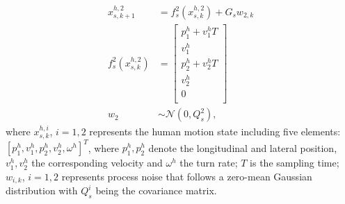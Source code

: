 \documentclass[journal]{IEEEtran}
\begin{document}
    \begin{subequations} \label{eqn:uniform_model}
		\begin{align}
			x_{s,k+1}^{h,2}&= f_s^2(x_{s,k}^{h,2})+G_sw_{2,k} \label{eqn:h_d_dyn}\\
f_s^2(x_{s,k}^{h,2})&=\left[
			\begin{array}{c}
				p^h_1+v^h_1T\\
				v^h_1\\
				p^h_2+v^h_2T\\
				v^h_2\\
				0\\ 
			\end{array}\right] \\            
			w_2&\sim\mathcal{N}(0,Q^2_s),
		\end{align}
	\end{subequations}\normalsize
	where $x_{s,k}^{h,i}$, $i=1,2$ represents the human motion state including five elements: $\left[p^h_1,v^h_1,p^h_2,v^h_2,\omega^h\right]^T$, where $p^h_1,p^h_2$ denote the longitudinal and lateral position, $v^h_1,v^h_2$ the corresponding velocity and $\omega^h$ the turn rate; $T$ is the sampling time; $w_{i,k}$, $i=1,2$ represents process noise that follows a zero-mean Gaussian distribution with $Q^i_s$ being the covariance matrix.
	
\end{document}
